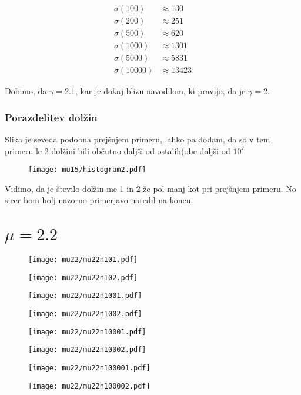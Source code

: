 \documentclass{article}
\begin{document}
\begin{align*}
\sigma(100) &\approx 130 \\
\sigma(200) &\approx 251 \\
\sigma(500) &\approx 620 \\
\sigma(1000) &\approx 1301 \\
\sigma(5000) &\approx 5831 \\
\sigma(10000) &\approx 13423
\end{align*}

Dobimo, da $\gamma= 2.1$, kar je dokaj blizu navodilom, ki pravijo, da je $\gamma = 2$.

\subsubsection{Porazdelitev dolžin}

Slika je seveda podobna prejšnjem primeru, lahko pa dodam, da so v tem primeru le 2 dolžini bili občutno daljši od ostalih(obe daljši od $10^7$

\begin{figure}[H]
\texttt{[image: mu15/histogram2.pdf]}
\end{figure}

Vidimo, da je število dolžin me 1 in 2 že pol manj kot pri prejšnjem primeru. No sicer bom bolj nazorno primerjavo naredil na koncu.

\section{$\mu=2.2$}

\begin{figure}[H]
\texttt{[image: mu22/mu22n101.pdf]}
\end{figure}
\begin{figure}[H]
\texttt{[image: mu22/mu22n102.pdf]}
\end{figure}
\begin{figure}[H]
\texttt{[image: mu22/mu22n1001.pdf]}
\end{figure}
\begin{figure}[H]
\texttt{[image: mu22/mu22n1002.pdf]}
\end{figure}
\begin{figure}[H]
\texttt{[image: mu22/mu22n10001.pdf]}
\end{figure}
\begin{figure}[H]
\texttt{[image: mu22/mu22n10002.pdf]}
\end{figure}
\begin{figure}[H]
\texttt{[image: mu22/mu22n100001.pdf]}
\end{figure}
\begin{figure}[H]
\texttt{[image: mu22/mu22n100002.pdf]}
\end{figure}
\end{document}
